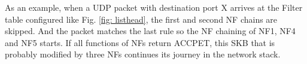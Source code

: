 As an example, when a UDP packet with destination port X arrives at the Filter table configured like Fig. \ref{fig: listhead}, the first and second NF chains are skipped. And the packet matches the last rule so the NF chaining of NF1, NF4 and NF5 starts. If all functions of NFs return ACCPET, this SKB that is probably modified by three NFs continues its journey in the network stack. 
